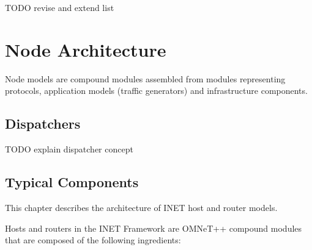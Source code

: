 TODO revise and extend list

\section{Node Architecture}

Node models are compound modules assembled from modules representing
protocols, application models (traffic generators) and infrastructure
components.

\subsection{Dispatchers}

TODO explain dispatcher concept

\subsection{Typical Components}

This chapter describes the architecture of INET host and router models.

Hosts and routers in the INET Framework are OMNeT++ compound modules that
are composed of the following ingredients:


